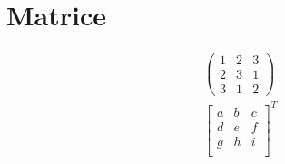 \documentclass[twocolumn, 12pt, a4paper]{article}
\begin{document}
\section{Matrice}
\begin{align}
&\begin{pmatrix}
		1 & 2 & 3\\
		2 & 3 & 1\\
		3 & 1 & 2
\end{pmatrix}\nonumber \\
&\begin{bmatrix}
		a & b & c \\
		d & e & f \\
		g & h & i \\
\end{bmatrix}^T
\end{align}

\tableofcontents
\end{document}
